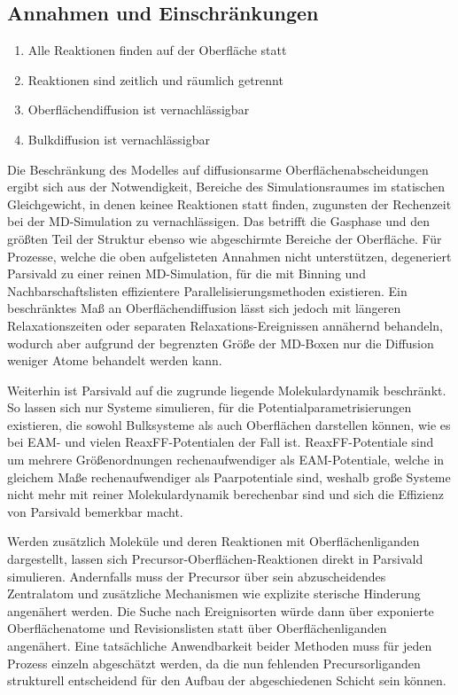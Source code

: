 \subsection{Annahmen und Einschränkungen}

\begin{enumerate}
\setlength\itemsep{0ex}
\item Alle Reaktionen finden auf der Oberfläche statt
\item Reaktionen sind zeitlich und räumlich getrennt
\item Oberflächendiffusion ist vernachlässigbar
\item Bulkdiffusion ist vernachlässigbar
\end{enumerate}

Die Beschränkung des Modelles auf diffusionsarme Oberflächenabscheidungen ergibt sich aus der Notwendigkeit, Bereiche des Simulationsraumes im statischen Gleichgewicht, in denen keinee Reaktionen statt finden, zugunsten der Rechenzeit bei der MD-Simulation zu vernachlässigen.
Das betrifft die Gasphase und den größten Teil der Struktur ebenso wie abgeschirmte Bereiche der Oberfläche.
Für Prozesse, welche die oben aufgelisteten Annahmen nicht unterstützen, degeneriert Parsivald zu einer reinen MD-Simulation, für die mit Binning und Nachbarschaftslisten effizientere Parallelisierungsmethoden existieren.
Ein beschränktes Maß an Oberflächendiffusion lässt sich jedoch mit längeren Relaxationszeiten oder separaten Relaxations-Ereignissen annähernd behandeln, wodurch aber aufgrund der begrenzten Größe der MD-Boxen nur die Diffusion weniger Atome behandelt werden kann.

Weiterhin ist Parsivald auf die zugrunde liegende Molekulardynamik beschränkt.
So lassen sich nur Systeme simulieren, für die Potentialparametrisierungen existieren, die sowohl Bulksysteme als auch Oberflächen darstellen können, wie es bei EAM- und vielen ReaxFF-Potentialen der Fall ist.
ReaxFF-Potentiale sind um mehrere Größenordnungen rechenaufwendiger als EAM-Potentiale, welche in gleichem Maße rechenaufwendiger als Paarpotentiale sind, weshalb große Systeme nicht mehr mit reiner Molekulardynamik berechenbar sind und sich die Effizienz von Parsivald bemerkbar macht.

Werden zusätzlich Moleküle und deren Reaktionen mit Oberflächenliganden dargestellt, lassen sich Precursor-Oberflächen-Reaktionen direkt in Parsivald simulieren.
Andernfalls muss der Precursor über sein abzuscheidendes Zentralatom und zusätzliche Mechanismen wie explizite sterische Hinderung angenähert werden.
Die Suche nach Ereignisorten würde dann über exponierte Oberflächenatome und Revisionslisten statt über Oberflächenliganden angenähert.
Eine tatsächliche Anwendbarkeit beider Methoden muss für jeden Prozess einzeln abgeschätzt werden, da die nun fehlenden Precursorliganden strukturell entscheidend für den Aufbau der abgeschiedenen Schicht sein können.

